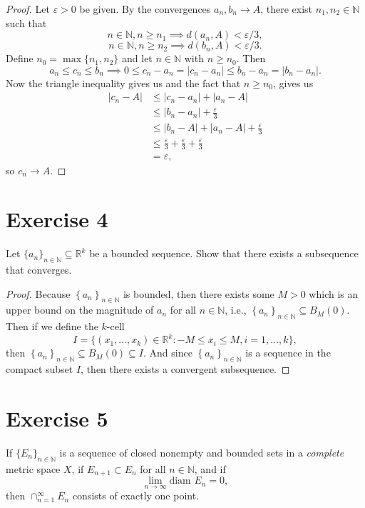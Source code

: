 \documentclass[12pt]{article}
\newenvironment{problem}
    {\begin{lrbox}{\mybox}\begin{minipage}{\textwidth-10pt}}
    {\end{minipage}\end{lrbox}\framebox[6.5in]{\usebox{\mybox}}}
\newcommand{\seq}[2][n]{\left\{#2\right\}_{#1\in\N}}
\newcommand{\<}{\left\langle}
\renewcommand{\>}{\right\rangle}
\newcommand{\N}{\mathbb{N}}
\newcommand{\R}{\mathbb{R}}
\let\eps\varepsilon
\begin{document}
\begin{proof}
    Let $\eps>0$ be given. By the convergences $a_n,b_n\to A$, there exist $n_1,n_2\in\N$ such that
    \[n\in\N, n\geq n_1 \implies d(a_n,A) < \eps/3,\]
    \[n\in\N, n\geq n_2 \implies d(b_n,A) < \eps/3.\]
    Define $n_0 = \max\{n_1,n_2\}$ and let $n\in\N$ with $n\geq n_0$. Then
    \[a_n\leq c_n\leq b_n \implies 0\leq c_n - a_n = |c_n-a_n| \leq b_n-a_n = |b_n - a_n|.\]
    Now the triangle inequality gives us and the fact that $n\geq n_0$, gives us
    \begin{align*}
        |c_n-A| 
            &\leq |c_n - a_n| + |a_n - A| \\
            &\leq |b_n - a_n| + \frac\eps3 \\
            &\leq |b_n - A| + |a_n - A| + \frac\eps3 \\
            &\leq \frac\eps3 + \frac\eps3 + \frac\eps3 \\
            &= \eps,
    \end{align*}
    so $c_n \to A$.

\end{proof}

\newpage
\section*{Exercise 4}
\begin{problem}
    Let $\{a_n\}_{n\in\mathbb{N}}\subseteq \mathbb{R}^k$ be a bounded sequence. Show that there exists a subsequence that converges.
\end{problem}

\begin{proof}
    Because $\seq{a_n}$ is bounded, then there exists some $M>0$ which is an upper bound on the magnitude of $a_n$ for all $n\in\N$, i.e., $\seq{a_n}\subseteq B_M(0)$. Then if we define the $k$-cell
    \[I = \{(x_1,\dots,x_k) \in \R^k : -M \leq x_i \leq M, i=1,\dots,k\},\]
    then $\seq{a_n}\subseteq B_M(0) \subseteq I$. And since $\seq{a_n}$ is a sequence in the compact subset $I$, then there exists a convergent subsequence.

\end{proof}

\newpage
\section*{Exercise 5}
\begin{problem}
    If $\{E_n\}_{n\in\mathbb{N}}$ is a sequence of closed nonempty and bounded sets in a {\it complete} metric space $X$, if $E_{n+1} \subset E_n$ for all $n\in \mathbb{N}$, and if 
    \[
    \lim_{n\to \infty} \text{diam } E_n = 0,
    \]
    then $\cap_{n=1}^\infty E_n$ consists of exactly one point.
\end{problem}
\end{document}
